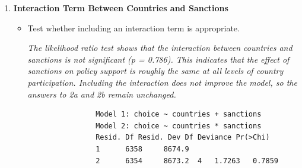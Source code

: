 \documentclass[12pt,letterpaper]{article}
\begin{document}
\begin{enumerate}
\begin{enumerate}
			
			
			\textit{
				For 20 participating countries, increasing sanctions from 5\% to 15\% also reduces the odds of supporting the policy by about 28\%, holding the number of countries constant. The effect is similar because the interaction is not significant.}
			
			\item Estimated probability of support if 80 countries participate with no sanctions?
			
			
			
			\textit{
				Given 80 countries participate and no sanctions, the predicted probability of support is approximately 52.5\%.}
		\end{enumerate}
		
		\item \textbf{Interaction Term Between Countries and Sanctions}
		
		\begin{itemize}
			\item Test whether including an interaction term is appropriate.
			
			
			
			\textit{
				The likelihood ratio test shows that the interaction between countries and sanctions is not significant (p = 0.786). This indicates that the effect of sanctions on policy support is roughly the same at all levels of country participation. Including the interaction does not improve the model, so the answers to 2a and 2b remain unchanged.}
			
			\begin{verbatim}
				Model 1: choice ~ countries + sanctions
				Model 2: choice ~ countries * sanctions
				Resid. Df Resid. Dev Df Deviance Pr(>Chi)
				1      6358     8674.9                     
				2      6354     8673.2  4   1.7263   0.7859
			\end{verbatim}
		\end{itemize}
		
	\end{enumerate}
\end{document}
